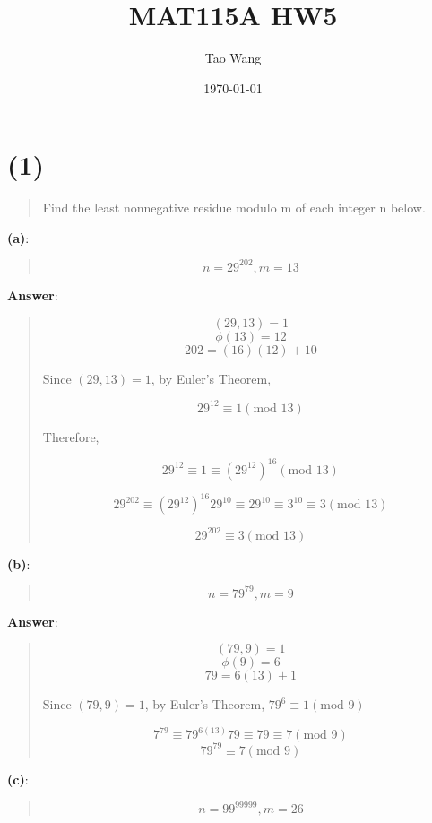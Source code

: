 \documentclass{article} %
\begin{document}
\title{MAT115A HW5}
\author{Tao Wang}
\date{\today}

\maketitle

\section*{(1)}
\begin{quote}
    Find the least nonnegative residue modulo m of each integer n below.
\end{quote}
\bigskip
\noindent
\textbf{(a)}:
\begin{quote}
    \[n = 29^{202}, m = 13\]
\end{quote}

\bigskip
\noindent
\textbf{Answer}:
\begin{quote}
    \[(29, 13) = 1\]
    \[\phi(13) = 12\]
    \[202 = (16)(12) + 10\]

    \begin{center}
        Since $(29, 13) = 1$, by Euler's Theorem,
    \end{center}
    \[29^{12} \equiv 1 (\text{mod } 13)\]
    \begin{center}
        Therefore,
    \end{center}
    \[29^{12} \equiv 1 \equiv (29^{12})^{16} (\text{mod } 13)\]

    \[29^{202} \equiv (29^{12})^{16} 29^{10} \equiv 29^{10} \equiv 3^{10} \equiv 3(\text{mod } 13)\]

    \[\boxed{29^{202} \equiv 3 (\text{mod } 13)}\]

\end{quote}
\bigskip
\noindent
\textbf{(b)}:
\begin{quote}
    \[n = 79^{79}, m = 9\]
\end{quote}

\bigskip
\noindent
\textbf{Answer}:
\begin{quote}
    \[(79, 9) = 1\]
    \[\phi(9) = 6\]
    \[79 = 6(13) + 1\]
    \begin{center}
        Since $(79, 9) = 1$, by Euler's Theorem, $79^{6} \equiv 1 (\text{mod } 9)$

        \[7^{79} \equiv 79^{6(13)}79 \equiv 79 \equiv 7 (\text{mod } 9)\]
        \[\boxed{79^{79} \equiv 7 (\text{mod } 9)}\]
    \end{center}

\end{quote}
\bigskip
\noindent
\textbf{(c)}:
\begin{quote}
    \[n = 99^{99999}, m = 26\]
\end{quote}
\end{document}

